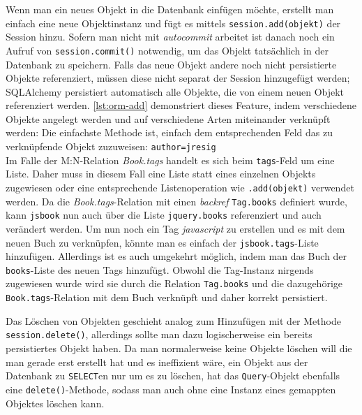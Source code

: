 Wenn man ein neues Objekt in die Datenbank einfügen möchte, erstellt man einfach
eine neue Objektinstanz und fügt es mittels \texttt{session.add(objekt)} der
Session hinzu. Sofern man nicht mit \emph{autocommit} arbeitet ist danach noch
ein Aufruf von \texttt{session.commit()} notwendig, um das Objekt tatsächlich in
der Datenbank zu speichern. Falls das neue Objekt andere noch nicht persistierte
Objekte referenziert, müssen diese nicht separat der Session hinzugefügt werden;
SQLAlchemy persistiert automatisch alle Objekte, die von einem neuen Objekt
referenziert werden. \autoref{lst:orm-add} demonstriert dieses Feature, indem
verschiedene Objekte angelegt werden und auf verschiedene Arten miteinander
verknüpft werden:
Die einfachste Methode ist, einfach dem entsprechenden Feld das zu verknüpfende
Objekt zuzuweisen: \texttt{author=jresig} \\
Im Falle der M:N-Relation \emph{Book.tags} handelt es sich beim
\texttt{tags}-Feld um eine Liste. Daher muss in diesem Fall eine Liste statt
eines einzelnen Objekts zugewiesen oder eine entsprechende Listenoperation
wie \texttt{.add(objekt)} verwendet werden. Da die \emph{Book.tags}-Relation
mit einen \textit{backref} \texttt{Tag.books} definiert wurde, kann
\texttt{jsbook} nun auch über die Liste \texttt{jquery.books} referenziert und
auch verändert werden. Um nun noch ein Tag \emph{javascript} zu erstellen und es
mit dem neuen Buch zu verknüpfen, könnte man es einfach der
\texttt{jsbook.tags}-Liste hinzufügen. Allerdings ist es auch umgekehrt möglich,
indem man das Buch der \texttt{books}-Liste des neuen Tags hinzufügt. Obwohl die
Tag-Instanz nirgends zugewiesen wurde wird sie durch die Relation
\texttt{Tag.books} und die dazugehörige \texttt{Book.tags}-Relation mit dem Buch
verknüpft und daher korrekt persistiert.



Das Löschen von Objekten geschieht analog zum Hinzufügen mit der Methode
\texttt{session.delete()}, allerdings sollte man dazu logischerweise ein
bereits persistiertes Objekt haben. Da man normalerweise keine Objekte löschen
will die man gerade erst erstellt hat und es ineffizient wäre, ein Objekt aus
der Datenbank zu \texttt{SELECT}en nur um es zu löschen, hat das
\texttt{Query}-Objekt ebenfalls eine \texttt{delete()}-Methode, sodass man auch
ohne eine Instanz eines gemappten Objektes löschen kann.

